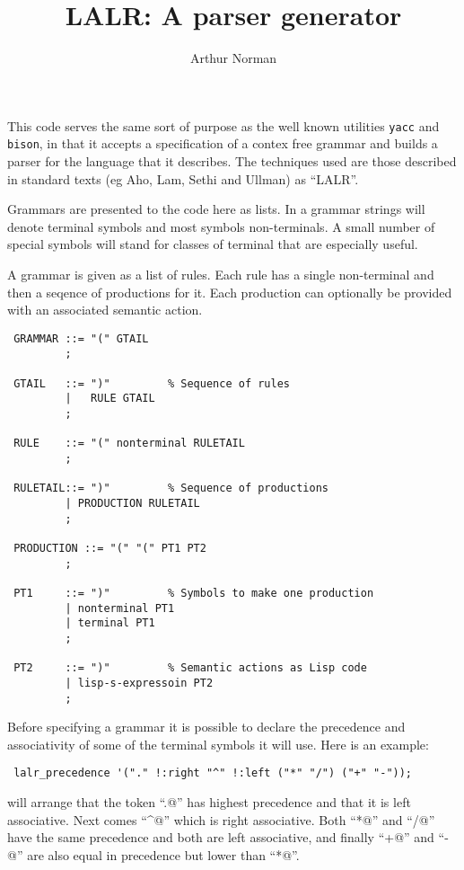 \documentclass[12pt]{article}
\title{LALR: A parser generator}
\author{Arthur Norman}
\begin{document}
\maketitle

This code serves the same sort of purpose as the well known utilities
\verb+yacc+ and \verb+bison+, in that it accepts a specification of a
contex free grammar and builds a parser for the language that it describes.
The techniques used are those described in standard texts (eg Aho, Lam,
Sethi and Ullman) as ``LALR''.

Grammars are presented to the code here as lists. In a grammar
strings will denote terminal symbols and most symbols non-terminals. A
small number of special symbols will stand for classes of terminal that
are especially useful.

A grammar is given as a list of rules. Each rule has a single non-terminal
and then a seqence of productions for it. Each production can optionally
be provided with an associated semantic action.

\begin{verbatim}
 GRAMMAR ::= "(" GTAIL
         ;

 GTAIL   ::= ")"         % Sequence of rules
         |   RULE GTAIL
         ;

 RULE    ::= "(" nonterminal RULETAIL
         ;

 RULETAIL::= ")"         % Sequence of productions
         | PRODUCTION RULETAIL
         ;

 PRODUCTION ::= "(" "(" PT1 PT2
         ;

 PT1     ::= ")"         % Symbols to make one production
         | nonterminal PT1
         | terminal PT1
         ;

 PT2     ::= ")"         % Semantic actions as Lisp code
         | lisp-s-expressoin PT2
         ; 
\end{verbatim}

Before specifying a grammar it is possible to declare the precedence and
associativity of some of the terminal symbols it will use. Here is an
example:
\begin{verbatim}
 lalr_precedence '("." !:right "^" !:left ("*" "/") ("+" "-"));
\end{verbatim}
\noindent will arrange that the token ``\verb@.@'' has highest precedence
and that it is left associative. Next comes ``\verb@^@'' which is right
associative.
Both ``\verb@*@'' and ``\verb@/@'' have the same precedence and both are
left associative, and finally ``\verb@+@'' and ``\verb@-@'' are also equal
in precedence but lower than ``\verb@*@''.
\end{document}
